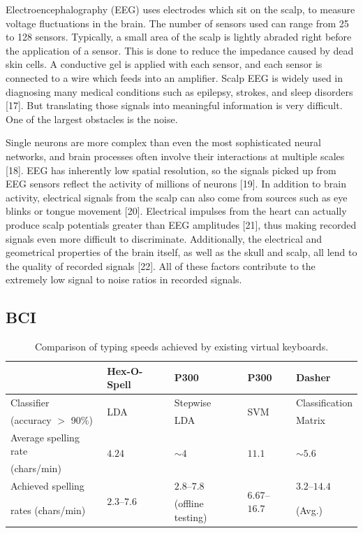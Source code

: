 \documentclass[12pt,titlepage]{article}
\begin{document}
Electroencephalography (EEG) uses electrodes which sit on the scalp, to measure voltage fluctuations 
in the brain.  The number of sensors used can range from 25 to 128 sensors.  Typically, a small area of 
the scalp is lightly abraded right before the application of a sensor.  This is done to reduce the 
impedance caused by dead skin cells.  A conductive gel is applied with each sensor, and each sensor is 
connected to a wire which feeds into an amplifier.  Scalp EEG is widely used in diagnosing many 
medical conditions such as epilepsy, strokes, and sleep disorders [17].  But translating those signals into 
meaningful information is very difficult.  One of the largest obstacles is the noise.

Single neurons are more complex than even the most sophisticated neural networks, and brain 
processes often involve their interactions at multiple scales [18].   EEG has inherently low spatial 
resolution, so the signals picked up from EEG  sensors reflect the activity of millions of neurons [19].  In 
addition to brain activity, electrical signals from the scalp can also come from sources such as eye 
blinks or tongue movement [20].  Electrical impulses from the heart can actually produce scalp potentials 
greater than EEG amplitudes [21], thus making recorded signals even more difficult to discriminate. 
Additionally, the electrical and geometrical properties of the brain itself, as well as the skull and scalp, 
all lend to the quality of recorded signals [22].  All of these factors contribute to the extremely low signal 
to noise ratios in recorded signals.


\subsection{BCI}

\begin{table}
\caption{Comparison of typing speeds achieved by existing virtual keyboards.}
\begin{center}
\begin{tabular}{lllll}
\hline\hline
& Hex-O-Spell & P300 & P300 & Dasher\\
\hline
Classifier & \multirow{2}{*}{LDA} & Stepwise & \multirow{2}{*}{SVM} & Classification \\
\quad (accuracy $>$ 90\%) & & LDA  & & Matrix \\
Average spelling rate & \multirow{2}{*}{$4.24$} & \multirow{2}{*}{$\sim4$} & \multirow{2}{*}{$11.1$} & \multirow{2}{*}{$\sim5.6$} \\
\quad (chars/min) & & & & \\
Achieved spelling & \multirow{2}{*}{$2.3$--$7.6$} & $2.8$--$7.8$ & \multirow{2}{*}{$6.67$--$16.7$} & $3.2$--$14.4$ \\
\quad rates (chars/min) & & (offline testing) & & (Avg.) \\
\hline\hline
\end{tabular}
\end{center}
\label{table:BCIComp}
\end{table}
\end{document}
